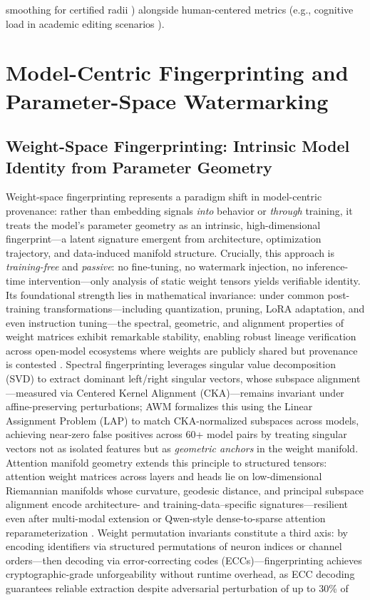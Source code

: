 \documentclass[11pt,a4paper]{article}
\begin{document}
smoothing for certified radii \cite{arxiv:2401.16820}) alongside human-centered metrics (e.g., cognitive load in academic editing scenarios \cite{arxiv:2403.04808}).


\section{Model-Centric Fingerprinting and Parameter-Space Watermarking}



\subsection{Weight-Space Fingerprinting: Intrinsic Model Identity from Parameter Geometry}


Weight-space fingerprinting represents a paradigm shift in model-centric provenance: rather than embedding signals \emph{into} behavior or \emph{through} training, it treats the model's parameter geometry as an intrinsic, high-dimensional fingerprint---a latent signature emergent from architecture, optimization trajectory, and data-induced manifold structure. Crucially, this approach is \emph{training-free} and \emph{passive}: no fine-tuning, no watermark injection, no inference-time intervention---only analysis of static weight tensors yields verifiable identity. Its foundational strength lies in mathematical invariance: under common post-training transformations---including quantization, pruning, LoRA adaptation, and even instruction tuning---the spectral, geometric, and alignment properties of weight matrices exhibit remarkable stability, enabling robust lineage verification across open-model ecosystems where weights are publicly shared but provenance is contested \cite{doi:10.1109/sds66131.2025.00024,doi:10.1109/icassp48485.2024.10447264,doi:10.3389/fdata.2021.729663}. Spectral fingerprinting leverages singular value decomposition (SVD) to extract dominant left/right singular vectors, whose subspace alignment---measured via Centered Kernel Alignment (CKA)---remains invariant under affine-preserving perturbations; AWM \cite{doi:10.3389/fdata.2021.729663} formalizes this using the Linear Assignment Problem (LAP) to match CKA-normalized subspaces across models, achieving near-zero false positives across 60+ model pairs by treating singular vectors not as isolated features but as \emph{geometric anchors} in the weight manifold. Attention manifold geometry extends this principle to structured tensors: attention weight matrices across layers and heads lie on low-dimensional Riemannian manifolds whose curvature, geodesic distance, and principal subspace alignment encode architecture- and training-data--specific signatures---resilient even after multi-modal extension or Qwen-style dense-to-sparse attention reparameterization \cite{doi:10.1109/icassp48485.2024.10447264,doi:10.1109/sds66131.2025.00024}. Weight permutation invariants constitute a third axis: by encoding identifiers via structured permutations of neuron indices or channel orders---then decoding via error-correcting codes (ECCs)---fingerprinting achieves cryptographic-grade unforgeability without runtime overhead, as ECC decoding guarantees reliable extraction despite adversarial perturbation of up to 30\% of 
\end{document}
